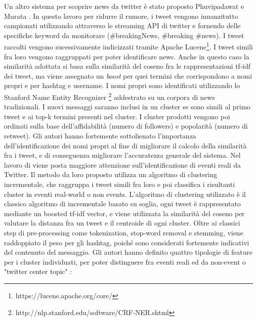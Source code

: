 \documentclass[a4paper,12pt]{report}
\begin{document}
Un altro sistema per scoprire news da twitter è stato proposto Phuvipadawat e Murata \cite{Phuvipadawat:2010:BND:1913791.1913911}. In questo lavoro per ridurre il rumore, i tweet vengono innanzitutto campionati utilizzando attraverso le  streaming API di twitter e fornendo delle specifiche keyword da monitorare (\#breakingNews, \#breaking \#news). I tweet raccolti vengono sucessivamente indicizzati tramite Apache Lucene\footnote{https://lucene.apache.org/core/}. I tweet simili fra loro vengono raggruppati per poter identificare news. Anche in questo caso la similarità adottata si basa sulla similarità del coseno fra le rappresentazioni tf-idf dei tweet, ma viene assegnato un \emph{boost} per quei termini che corrispondono a nomi propri e per hashtag e username. I nomi propri sono identificati utilizzando lo Stanford Name Entity Recognizer \footnote{http://nlp.stanford.edu/software/CRF-NER.shtml} addestrato su un corpora di news tradizionali.
 I nuovi messaggi saranno inclusi in un cluster se sono simili al primo tweet   e ai top-k termini  presenti nel cluster. I cluster prodotti vengono poi ordinati sulla base 
dell'affidabilità (numero di followers) e popolarità (numero di retweet).
Gli autori hanno fortemente sottolienato l'importanza dell'identificazione dei nomi propri al fine di migliorare il calcolo della similarità fra i tweet, e di conseguenza migliorare l'accuratezza generale del sistema.
Nel lavoro di \cite{DBLP:conf/icwsm/BeckerNG11} viene posta maggiore attenzione sull'identificazione di eventi reali da Twitter. Il metodo da loro proposto utilizza un algoritmo di clustering incrementale, che raggruppa i tweet simili fra loro e poi classifica i risultanti cluster in eventi real-world o non events. L'algoritmo di clustering utilizzato è il classico algoritmo di incrementale basato su soglia, ogni tweet è rappresentato mediante un boosted tf-idf vector, e viene utilizzata la similarità del coseno per valutare la distanza fra un tweet e il centroide di ogni cluster. Oltre ai classici step di pre-processing come tokenization, stop-word removal e stemming, viene raddoppiato il peso per gli hashtag, poiché sono considerati fortemente indicativi del contenuto del messaggio. Gli autori hanno definito quattro tipologie di feature per i cluster individuati, per poter distinguere fra eventi reali ed da non-event o "twitter center topic" :
\end{document}
